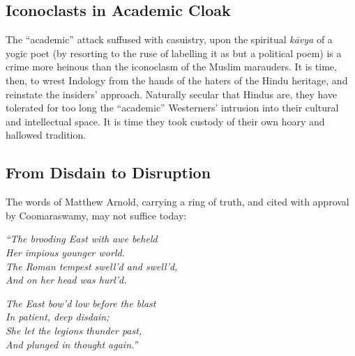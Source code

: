 \subsection*{Iconoclasts in Academic Cloak}

The “academic” attack suffused with casuistry, upon the spiritual {\sl kāvya} of a yogic poet (by resorting to the ruse of labelling it as but a political poem) is a crime more heinous than the iconoclasm of the Muslim marauders. It is time, then, to wrest Indology from the hands of the haters of the Hindu heritage, and reinstate the insiders’ approach. Naturally secular that Hindus are, they have  tolerated for too long the “academic” Westerners’ intrusion into their cultural and intellectual space. It is time they took custody of their own hoary and hallowed tradition.\\[-20pt] 

\subsection*{From Disdain to Disruption}

The words of Matthew Arnold, carrying a ring of truth, and cited with approval by Coomaraswamy, may not suffice today:

\begin{myquote}
{{\sl ``The brooding East with awe beheld}}\\
{\sl Her impious younger world.}\\
{\sl The Roman tempest swell'd and swell'd,}\\
{\sl And on her head was hurl'd.}
\end{myquote}


\begin{myquote}
{{\sl The East bow'd low before the blast}}\\
{\sl In patient, deep disdain;}\\
{\sl She let the legions thunder past,}\\
{\sl And plunged in thought again.''}
\end{myquote}

